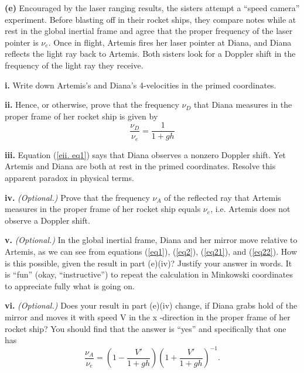 \documentclass[a4paper]{article} %
\begin{document}
\begin{framed}
\textbf{(e)} Encouraged by the laser ranging results, the sisters attempt a ``speed camera'' experiment. Before blasting off in their rocket ships, they compare notes while at rest in the global inertial frame and agree that the proper frequency of the laser pointer is $\nu_e$. Once in flight, Artemis fires her laser pointer at Diana, and Diana reflects the light ray back to Artemis. Both sisters look for a Doppler shift in the frequency of the light ray they receive.
\end{framed}

\begin{framed}
\textbf{i.} Write down Artemis's and Diana's 4-velocities in the primed coordinates.
\end{framed}

\begin{framed}
\textbf{ii.} Hence, or otherwise, prove that the frequency $\nu_D$ that Diana measures in the proper frame of her rocket ship is given by
\begin{equation}
\frac{\nu_D}{\nu_e}=\frac{1}{1+gh}\label{eii. eq1}
\end{equation}
\end{framed}

\begin{framed}
\textbf{iii.} Equation (\ref{eii. eq1}) says that Diana observes a nonzero Doppler shift. Yet Artemis and Diana are both at rest in the primed coordinates. Resolve this apparent paradox in physical terms.
\end{framed}

\begin{framed}
\textbf{iv.} \emph{(Optional.)} Prove that the frequency $\nu_A$ of the reflected ray that Artemis measures in the proper frame of her rocket ship equals $\nu_e$, i.e. Artemis does not observe a Doppler shift.
\end{framed}

\begin{framed}
\textbf{v.} \emph{(Optional.)} In the global inertial frame, Diana and her mirror move relative to Artemis, as we can see from equations (\ref{eq1}), (\ref{eq2}), (\ref{eq21}), and (\ref{eq22}). How is this possible, given the result in part (e)(iv)? Justify your answer in words. It is ``fun'' (okay, ``instructive'') to repeat the calculation in Minkowski coordinates to appreciate fully what is going on.
\end{framed}

\begin{framed}
\textbf{vi.} \emph{(Optional.)} Does your result in part (e)(iv) change, if Diana grabs hold of the mirror and moves it with speed V in the x -direction in the proper frame of her rocket ship? You should find that the answer is ``yes'' and specifically that one has
\begin{equation}
\frac{\nu_A}{\nu_e}=\left(1-\frac{V'}{1+gh}\right)\left(1+\frac{V'}{1+gh}\right)^{-1}.
\end{equation}
\end{framed}
\end{document}

